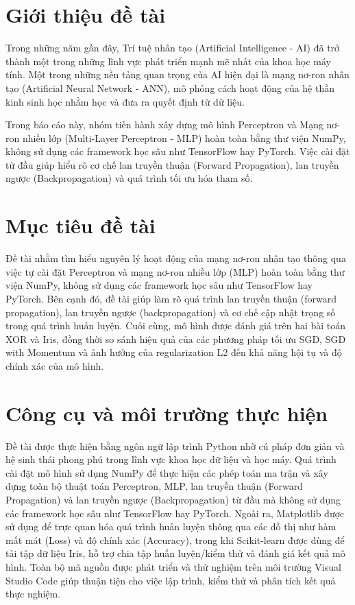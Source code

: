 \documentclass[12pt,a4paper]{report}
\begin{document}
\section{Giới thiệu đề tài}
Trong những năm gần đây, Trí tuệ nhân tạo (Artificial Intelligence - AI) đã trở thành một trong những lĩnh vực phát triển mạnh mẽ nhất của khoa học máy tính. Một trong những nền tảng quan trọng của AI hiện đại là mạng nơ-ron nhân tạo (Artificial Neural Network - ANN), mô phỏng cách hoạt động của hệ thần kinh sinh học nhằm học và đưa ra quyết định từ dữ liệu.

Trong báo cáo này, nhóm tiến hành xây dựng mô hình Perceptron và Mạng nơ-ron nhiều lớp (Multi-Layer Perceptron - MLP) hoàn toàn bằng thư viện NumPy, không sử dụng các framework học sâu như TensorFlow hay PyTorch. Việc cài đặt từ đầu giúp hiểu rõ cơ chế lan truyền thuận (Forward Propagation), lan truyền ngược (Backpropagation) và quá trình tối ưu hóa tham số.

\section{Mục tiêu đề tài}
Đề tài nhằm tìm hiểu nguyên lý hoạt động của mạng nơ-ron nhân tạo thông qua việc tự cài đặt Perceptron và mạng nơ-ron nhiều lớp (MLP) hoàn toàn bằng thư viện NumPy, không sử dụng các framework học sâu như TensorFlow hay PyTorch. Bên cạnh đó, đề tài giúp làm rõ quá trình lan truyền thuận (forward propagation), lan truyền ngược (backpropagation) và cơ chế cập nhật trọng số trong quá trình huấn luyện. Cuối cùng, mô hình được đánh giá trên hai bài toán XOR và Iris, đồng thời so sánh hiệu quả của các phương pháp tối ưu SGD, SGD with Momentum và ảnh hưởng của regularization L2 đến khả năng hội tụ và độ chính xác của mô hình.

\section{Công cụ và môi trường thực hiện}
Đề tài được thực hiện bằng ngôn ngữ lập trình Python nhờ cú pháp đơn giản và hệ sinh thái phong phú trong lĩnh vực khoa học dữ liệu và học máy. Quá trình cài đặt mô hình sử dụng NumPy để thực hiện các phép toán ma trận và xây dựng toàn bộ thuật toán Perceptron, MLP, lan truyền thuận (Forward Propagation) và lan truyền ngược (Backpropagation) từ đầu mà không sử dụng các framework học sâu như TensorFlow hay PyTorch. Ngoài ra, Matplotlib được sử dụng để trực quan hóa quá trình huấn luyện thông qua các đồ thị như hàm mất mát (Loss) và độ chính xác (Accuracy), trong khi Scikit-learn được dùng để tải tập dữ liệu Iris, hỗ trợ chia tập huấn luyện/kiểm thử và đánh giá kết quả mô hình. Toàn bộ mã nguồn được phát triển và thử nghiệm trên môi trường Visual Studio Code giúp thuận tiện cho việc lập trình, kiểm thử và phân tích kết quả thực nghiệm.
\end{document}
